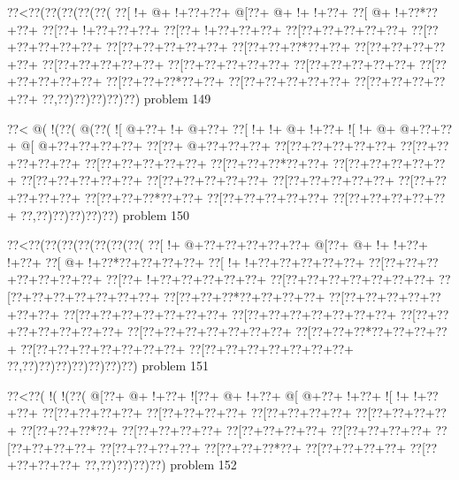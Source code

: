 \vbox{\vbox{\goo
\0??<\0??(\0??(\0??(\0??(\0??(
\0??[\- !+\- @+\- !+\0??+\0??+
\- @[\0??+\- @+\- !+\- !+\0??+
\0??[\- @+\- !+\0??*\0??+\0??+
\0??[\0??+\- !+\0??+\0??+\0??+
\0??[\0??+\- !+\0??+\0??+\0??+
\0??[\0??+\0??+\0??+\0??+\0??+
\0??[\0??+\0??+\0??+\0??+\0??+
\0??[\0??+\0??+\0??+\0??+\0??+
\0??[\0??+\0??+\0??*\0??+\0??+
\0??[\0??+\0??+\0??+\0??+\0??+
\0??[\0??+\0??+\0??+\0??+\0??+
\0??[\0??+\0??+\0??+\0??+\0??+
\0??[\0??+\0??+\0??+\0??+\0??+
\0??[\0??+\0??+\0??+\0??+\0??+
\0??[\0??+\0??+\0??*\0??+\0??+
\0??[\0??+\0??+\0??+\0??+\0??+
\0??[\0??+\0??+\0??+\0??+\0??+
\0??,\0??)\0??)\0??)\0??)\0??)
}
\hfil problem 149\hfil\break
}

\vbox{\vbox{\goo
\0??<\- @(\- !(\0??(\- @(\0??(
\- ![\- @+\0??+\- !+\- @+\0??+
\0??[\- !+\- !+\- @+\- !+\0??+
\- ![\- !+\- @+\- @+\0??+\0??+
\- @[\- @+\0??+\0??+\0??+\0??+
\0??[\0??+\- @+\0??+\0??+\0??+
\0??[\0??+\0??+\0??+\0??+\0??+
\0??[\0??+\0??+\0??+\0??+\0??+
\0??[\0??+\0??+\0??+\0??+\0??+
\0??[\0??+\0??+\0??*\0??+\0??+
\0??[\0??+\0??+\0??+\0??+\0??+
\0??[\0??+\0??+\0??+\0??+\0??+
\0??[\0??+\0??+\0??+\0??+\0??+
\0??[\0??+\0??+\0??+\0??+\0??+
\0??[\0??+\0??+\0??+\0??+\0??+
\0??[\0??+\0??+\0??*\0??+\0??+
\0??[\0??+\0??+\0??+\0??+\0??+
\0??[\0??+\0??+\0??+\0??+\0??+
\0??,\0??)\0??)\0??)\0??)\0??)
}
\hfil problem 150\hfil\break
}

\vbox{\vbox{\goo
\0??<\0??(\0??(\0??(\0??(\0??(\0??(\0??(
\0??[\- !+\- @+\0??+\0??+\0??+\0??+\0??+
\- @[\0??+\- @+\- !+\- !+\0??+\- !+\0??+
\0??[\- @+\- !+\0??*\0??+\0??+\0??+\0??+
\0??[\- !+\- !+\0??+\0??+\0??+\0??+\0??+
\0??[\0??+\0??+\0??+\0??+\0??+\0??+\0??+
\0??[\0??+\- !+\0??+\0??+\0??+\0??+\0??+
\0??[\0??+\0??+\0??+\0??+\0??+\0??+\0??+
\0??[\0??+\0??+\0??+\0??+\0??+\0??+\0??+
\0??[\0??+\0??+\0??*\0??+\0??+\0??+\0??+
\0??[\0??+\0??+\0??+\0??+\0??+\0??+\0??+
\0??[\0??+\0??+\0??+\0??+\0??+\0??+\0??+
\0??[\0??+\0??+\0??+\0??+\0??+\0??+\0??+
\0??[\0??+\0??+\0??+\0??+\0??+\0??+\0??+
\0??[\0??+\0??+\0??+\0??+\0??+\0??+\0??+
\0??[\0??+\0??+\0??*\0??+\0??+\0??+\0??+
\0??[\0??+\0??+\0??+\0??+\0??+\0??+\0??+
\0??[\0??+\0??+\0??+\0??+\0??+\0??+\0??+
\0??,\0??)\0??)\0??)\0??)\0??)\0??)\0??)
}
\hfil problem 151\hfil\break
}

\vbox{\vbox{\goo
\0??<\0??(\- !(\- !(\0??(
\- @[\0??+\- @+\- !+\0??+
\- ![\0??+\- @+\- !+\0??+
\- @[\- @+\0??+\- !+\0??+
\- ![\- !+\- !+\0??+\0??+
\0??[\0??+\0??+\0??+\0??+
\0??[\0??+\0??+\0??+\0??+
\0??[\0??+\0??+\0??+\0??+
\0??[\0??+\0??+\0??+\0??+
\0??[\0??+\0??+\0??*\0??+
\0??[\0??+\0??+\0??+\0??+
\0??[\0??+\0??+\0??+\0??+
\0??[\0??+\0??+\0??+\0??+
\0??[\0??+\0??+\0??+\0??+
\0??[\0??+\0??+\0??+\0??+
\0??[\0??+\0??+\0??*\0??+
\0??[\0??+\0??+\0??+\0??+
\0??[\0??+\0??+\0??+\0??+
\0??,\0??)\0??)\0??)\0??)
}
\hfil problem 152\hfil\break
}

